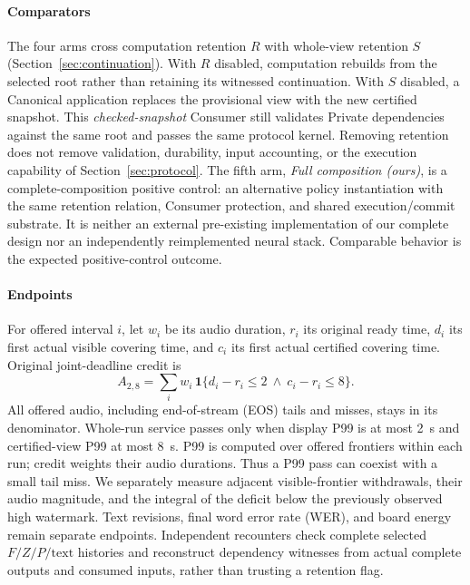 \paragraph{Comparators}
The four arms cross computation retention $R$ with whole-view retention
$S$ (Section~\ref{sec:continuation}). With $R$ disabled, computation
rebuilds from the selected root rather than retaining its witnessed
continuation. With $S$ disabled, a Canonical application replaces the
provisional view with the new certified snapshot. This
\emph{checked-snapshot} Consumer still validates Private dependencies
against the same root and passes the same protocol kernel. Removing
retention does not remove validation, durability, input accounting, or
the execution capability of Section~\ref{sec:protocol}.
The fifth arm, \emph{Full composition (ours)}, is a complete-composition
positive control: an alternative policy instantiation with the same
retention relation, Consumer protection, and shared execution/commit
substrate. It is neither an external pre-existing implementation of our
complete design nor an independently reimplemented neural stack.
Comparable behavior is the expected positive-control outcome.

\paragraph{Endpoints}
For offered interval $i$, let $w_i$ be its audio duration, $r_i$ its
original ready time, $d_i$ its first actual visible covering time, and
$c_i$ its first actual certified covering time. Original joint-deadline
credit is
\begin{equation}
 A_{2,8}=\sum_i w_i\,\mathbf{1}
 \{d_i-r_i\leq2\ \land\ c_i-r_i\leq8\}.
 \label{eq:credit}
\end{equation}
All offered audio, including end-of-stream (EOS) tails and misses, stays
in its denominator. Whole-run service passes only when display P99 is
at most 2~s and certified-view P99 at most 8~s. P99 is computed over
offered frontiers within each run; credit weights their audio durations.
Thus a P99 pass can coexist with a small tail miss. We separately measure
adjacent visible-frontier withdrawals, their audio magnitude, and the
integral of the deficit below the previously observed high watermark.
Text revisions, final word error rate (WER), and board energy remain
separate endpoints. Independent recounters check complete selected
$F/Z/P/\mathrm{text}$ histories and reconstruct dependency witnesses from
actual complete outputs and consumed inputs, rather than trusting a
retention flag.

